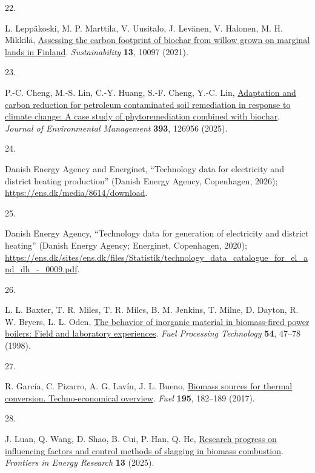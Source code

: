 \documentclass[
  letterpaper,
]{article}
\newlength{\cslhangindent}
\newlength{\csllabelwidth}
\newenvironment{CSLReferences}[2] %
 {\begin{list}{}{%
  \setlength{\itemindent}{0pt}
  \setlength{\leftmargin}{0pt}
  \setlength{\parsep}{0pt}
  \ifodd #1
   \setlength{\leftmargin}{\cslhangindent}
   \setlength{\itemindent}{-1\cslhangindent}
  \fi
  \setlength{\itemsep}{#2\baselineskip}}}
 {\end{list}}
\newcommand{\CSLLeftMargin}[1]{\parbox[t]{\csllabelwidth}{\strut#1\strut}}
\newcommand{\CSLRightInline}[1]{\parbox[t]{\linewidth - \csllabelwidth}{\strut#1\strut}}
\begin{document}
\begin{CSLReferences}{0}{1}
\CSLLeftMargin{22. }%
\CSLRightInline{L. Leppäkoski, M. P. Marttila, V. Uusitalo, J. Levänen,
V. Halonen, M. H. Mikkilä,
\href{https://doi.org/10.3390/su131810097}{Assessing the carbon
footprint of biochar from willow grown on marginal lands in {Finland}}.
\emph{Sustainability} \textbf{13}, 10097 (2021).}

\CSLLeftMargin{23. }%
\CSLRightInline{P.-C. Cheng, M.-S. Lin, C.-Y. Huang, S.-F. Cheng, Y.-C.
Lin, \href{https://doi.org/10.1016/j.jenvman.2025.126956}{Adaptation and
carbon reduction for petroleum contaminated soil remediation in response
to climate change: A case study of phytoremediation combined with
biochar}. \emph{Journal of Environmental Management} \textbf{393},
126956 (2025).}

\CSLLeftMargin{24. }%
\CSLRightInline{Danish Energy Agency and Energinet, {``Technology data
for electricity and district heating production''} (Danish Energy
Agency, Copenhagen, 2026); \url{https://ens.dk/media/8614/download}.}

\CSLLeftMargin{25. }%
\CSLRightInline{Danish Energy Agency, {``Technology data for generation
of electricity and district heating''} (Danish Energy Agency; Energinet,
Copenhagen, 2020);
\url{https://ens.dk/sites/ens.dk/files/Statistik/technology_data_catalogue_for_el_and_dh_-_0009.pdf}.}

\CSLLeftMargin{26. }%
\CSLRightInline{L. L. Baxter, T. R. Miles, T. R. Miles, B. M. Jenkins,
T. Milne, D. Dayton, R. W. Bryers, L. L. Oden,
\href{https://doi.org/10.1016/S0378-3820(97)00060-X}{The behavior of
inorganic material in biomass-fired power boilers: Field and laboratory
experiences}. \emph{Fuel Processing Technology} \textbf{54}, 47--78
(1998).}

\CSLLeftMargin{27. }%
\CSLRightInline{R. García, C. Pizarro, A. G. Lavín, J. L. Bueno,
\href{https://doi.org/10.1016/j.fuel.2017.01.063}{Biomass sources for
thermal conversion. Techno-economical overview}. \emph{Fuel}
\textbf{195}, 182--189 (2017).}

\CSLLeftMargin{28. }%
\CSLRightInline{J. Luan, Q. Wang, D. Shao, B. Cui, P. Han, Q. He,
\href{https://doi.org/10.3389/fenrg.2025.1634354}{Research progress on
influencing factors and control methods of slagging in biomass
combustion}. \emph{Frontiers in Energy Research} \textbf{13} (2025).}


\end{CSLReferences}
\end{document}
